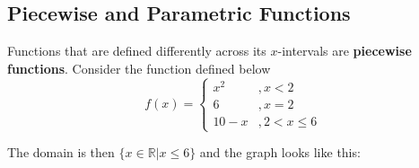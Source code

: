         \begin{center}
        \end{center}



    \subsection{Piecewise and Parametric Functions}
        Functions that are defined differently across its $x$-intervals are
        \textbf{piecewise functions}. Consider the function defined below \\

        \begin{equation*}
            f(x)=
            \begin{cases}
                x^2 & ,x<2 \\
                6 & ,x=2 \\
                10-x & , 2<x\leq 6
            \end{cases}
        \end{equation*}

        \noindent The domain is then $\{x\in\mathbb{R}|x\leq 6\}$ and the graph looks like this: \\


